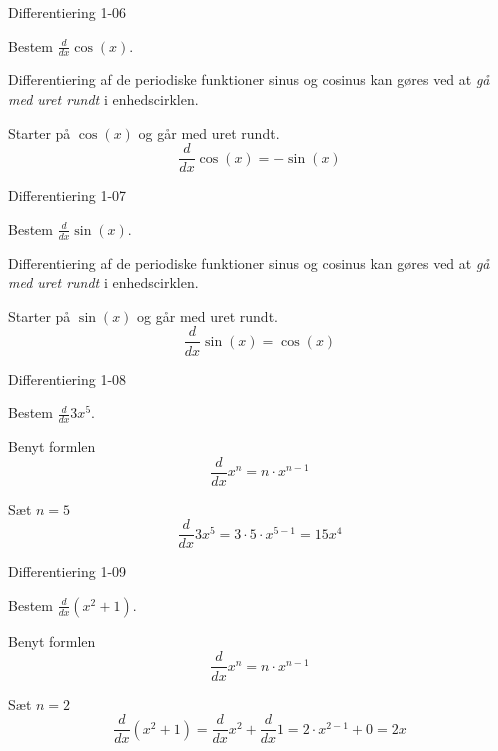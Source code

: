 \documentclass{article}
\begin{document}
\begin{exercise}{Differentiering 1-06}

Bestem $\frac{d}{dx} \cos(x) $.


\hint

Differentiering af de periodiske funktioner sinus og cosinus kan gøres ved at \emph{gå med uret rundt} i enhedscirklen.

\hint

Starter på $\cos(x)$ og går med uret rundt.
\[
\frac{d}{dx} \cos(x) = - \sin(x)
\]



\end{exercise}

\begin{exercise}{Differentiering 1-07}

Bestem $\frac{d}{dx} \sin(x) $.


\hint

Differentiering af de periodiske funktioner sinus og cosinus kan gøres ved at \emph{gå med uret rundt} i enhedscirklen.

\hint

Starter på $\sin(x)$ og går med uret rundt.
\[
\frac{d}{dx} \sin(x) = \cos(x)
\]


\end{exercise}

\begin{exercise}{Differentiering 1-08}

Bestem $\frac{d}{dx} 3 x^5$.


\hint

Benyt formlen
\[
\frac{d}{dx} x^n = n \cdot x^{n - 1}
\]

\hint

Sæt $n = 5$
\[
\frac{d}{dx} 3 x^5 = 3 \cdot 5 \cdot x^{5 - 1} = 15 x^4
\]
\end{exercise}

\begin{exercise}{Differentiering 1-09}

Bestem $\frac{d}{dx} \left(x^2 + 1 \right)$.


\hint

Benyt formlen
\[
\frac{d}{dx} x^n = n \cdot x^{n - 1}
\]

\hint

Sæt $n = 2$
\[
\frac{d}{dx} \left(x^2 + 1 \right) = \frac{d}{dx} x^2 + \frac{d}{dx} 1 = 2 \cdot x^{2 - 1} + 0 = 2 x
\]
\end{exercise}
\end{document}
